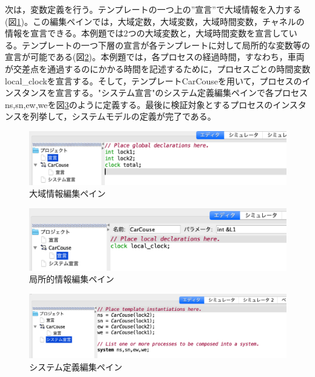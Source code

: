 \documentclass{tpu-sotu}
\begin{document}
	次は，変数定義を行う。テンプレートの一つ上の”宣言”で大域情報を入力する(図\ref{GD})。この編集ペインでは，大域定数，大域変数，大域時間変数，チャネルの情報を宣言できる。本例題では2つの大域変数と，大域時間変数を宣言している。テンプレートの一つ下層の宣言が各テンプレートに対して局所的な変数等の宣言が可能である(図\ref{LD})。本例題では，各プロセスの経過時間，すなわち，車両が交差点を通過するのにかかる時間を記述するために，プロセスごとの時間変数local\_clockを宣言する。そして，テンプレートCarCouseを用いて，プロセスのインスタンスを宣言する。"システム宣言"のシステム定義編集ペインで各プロセスns,sn,ew,weを図\ref{SysD}のように定義する。最後に検証対象とするプロセスのインスタンスを列挙して，システムモデルの定義が完了である。
	\begin{figure}[htbp]
	\centering
	\includegraphics[width=140mm]{GlobalDec.png}
	\caption{大域情報編集ペイン}
	\label{GD}
	\end{figure}
	\begin{figure}[htbp]
	\centering
	\includegraphics[width=140mm]{LocalDec.png}
	\caption{局所的情報編集ペイン}
	\label{LD}
	\end{figure}
	\begin{figure}[htbp]
	\centering
	\includegraphics[width=140mm]{SystemDec.png}
	\caption{システム定義編集ペイン}
	\label{SysD}
	\end{figure}
	
\end{document}
